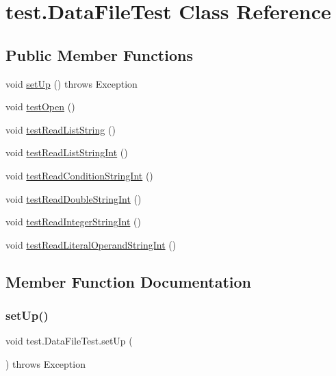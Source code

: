 \hypertarget{classtest_1_1_data_file_test}{}\section{test.\+Data\+File\+Test Class Reference}
\label{classtest_1_1_data_file_test}
\subsection*{Public Member Functions}
\begin{DoxyCompactItemize}
\item 
void \hyperlink{classtest_1_1_data_file_test_a0c4aa82f4822e250fa2ea1d238f25f87}{set\+Up} ()  throws Exception 
\item 
void \hyperlink{classtest_1_1_data_file_test_aa7338ead543ecd8b09f2a0d5a93c3ee8}{test\+Open} ()
\item 
void \hyperlink{classtest_1_1_data_file_test_ad4b0d957eebabf51055d0e7c8be254e7}{test\+Read\+List\+String} ()
\item 
void \hyperlink{classtest_1_1_data_file_test_ab61a29d98e2d1b08099008e0a5c53b63}{test\+Read\+List\+String\+Int} ()
\item 
void \hyperlink{classtest_1_1_data_file_test_afceb03fbe887feb7c9c51074ea1c41d8}{test\+Read\+Condition\+String\+Int} ()
\item 
void \hyperlink{classtest_1_1_data_file_test_a839677c199693ab93375ec09dfbb3407}{test\+Read\+Double\+String\+Int} ()
\item 
void \hyperlink{classtest_1_1_data_file_test_aa614885277711640980410c5faa5b609}{test\+Read\+Integer\+String\+Int} ()
\item 
void \hyperlink{classtest_1_1_data_file_test_ad4298b1da8ab563a46e4adfdc3d15720}{test\+Read\+Literal\+Operand\+String\+Int} ()
\end{DoxyCompactItemize}


\subsection{Member Function Documentation}
\mbox{\label{classtest_1_1_data_file_test_a0c4aa82f4822e250fa2ea1d238f25f87}} 
\subsubsection{\texorpdfstring{set\+Up()}{setUp()}}
{\footnotesize\ttfamily void test.\+Data\+File\+Test.\+set\+Up (\begin{DoxyParamCaption}{ }\end{DoxyParamCaption}) throws Exception}

